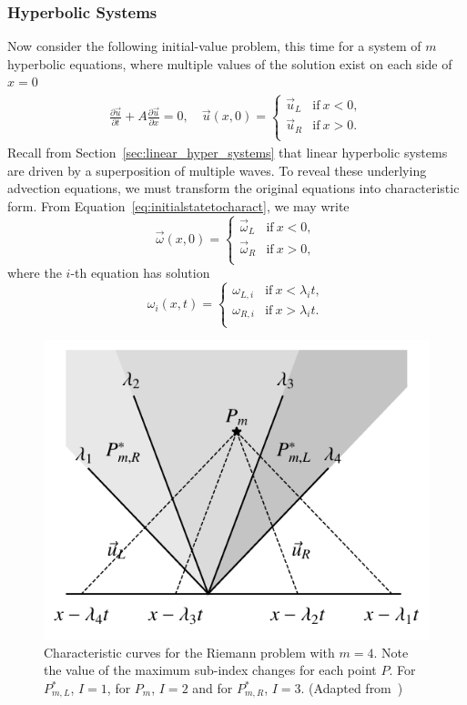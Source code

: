 \subsubsection{Hyperbolic Systems}
Now consider the following initial-value problem, this time for a system of $m$ hyperbolic equations, where multiple values of the solution exist on each side of $x=0$
\begin{align}
	\frac{\partial \vec u}{\partial t} +A \frac{\partial \vec u}{\partial x} = 0, \quad \vec u(x,0) = 
	\begin{cases}
		\vec u_L & \text{if}~x<0,\\
		\vec u_R & \text{if}~x>0.\\
	\end{cases}
	\label{eq:ivp_linearsys}
\end{align}
Recall from Section~\ref{sec:linear_hyper_systems} that linear hyperbolic systems are driven by a superposition of multiple waves. To reveal these underlying advection equations, we must transform the original equations into characteristic form. From Equation~\ref{eq:initialstatetocharact}, we may write
\begin{equation}
	\vec \omega(x,0) = 
	\begin{cases}
		\vec \omega_L & \text{if}~x<0,\\
		\vec \omega_R & \text{if}~x>0,\\
	\end{cases}
	\label{eq:ivp_linearsys}
\end{equation}
where the $i$-th equation has solution
\begin{equation}
	\omega_i(x,t) = 
	\begin{cases}
		\omega_{L,i} &\text{if}~x<\lambda_i t, \\
		\omega_{R,i} &\text{if}~x>\lambda_i t. \\
	\end{cases}
\end{equation}
\begin{figure}[htbp]
	\centering
	\includegraphics[width=0.5\linewidth]{Pictures/ch11_riem_lsys_characteristics}
	\caption{Characteristic curves for the Riemann problem with $m=4$. Note the value of the maximum sub-index changes for each point $P$. For $P_{m,L}^*$, $I=1$, for $P_{m}$, $I=2$ and for $P_{m,R}^*$, $I=3$. (Adapted from~\cite{leveque})}
	\label{fig:characteristics_riemann}
\end{figure}
